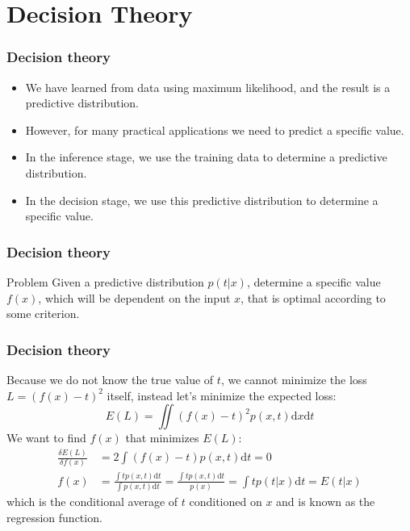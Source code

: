 \documentclass{beamer}
\begin{document}
\section{Decision Theory}

\begin{frame}
    \frametitle{Decision theory}
    \begin{itemize}
        \item We have learned from data using maximum likelihood, and the result is a predictive distribution.
        \item However, for many practical applications we need to predict a specific value.
        \item In the inference stage, we use the training data to determine a predictive distribution.
        \item In the decision stage, we use this predictive distribution to determine a specific value.
    \end{itemize}
\end{frame}

\begin{frame}
    \frametitle{Decision theory}
    \begin{block}{Problem}
        Given a predictive distribution $p(t|x)$, determine a specific value $f(x)$, which will be dependent on the input $x$, that is optimal according to some criterion.
    \end{block}
\end{frame}

\begin{frame}
    \frametitle{Decision theory}
    Because we do not know the true value of $t$, we cannot minimize the loss $L=(f(x)-t)^{2}$ itself, instead let's minimize the expected loss:
    \begin{equation*}
        E(L)=\iint(f(x)-t)^{2}p(x,t)\mathrm{d}x\mathrm{d}t
    \end{equation*}
    We want to find $f(x)$ that minimizes $E(L)$:
    \begin{align*}
        \frac{\delta{}E(L)}{\delta{}f(x)}&=2\int(f(x)-t)p(x,t)\mathrm{d}t=0 \\
        f(x)&=\frac{\int{}tp(x,t)\mathrm{d}t}{\int{}p(x,t)\mathrm{d}t}=\frac{\int{}tp(x,t)\mathrm{d}t}{p(x)}=\int{}tp(t|x)\mathrm{d}t=E(t|x)
    \end{align*}
    which is the conditional average of $t$ conditioned on $x$ and is known as the regression function.
\end{frame}
\end{document}
